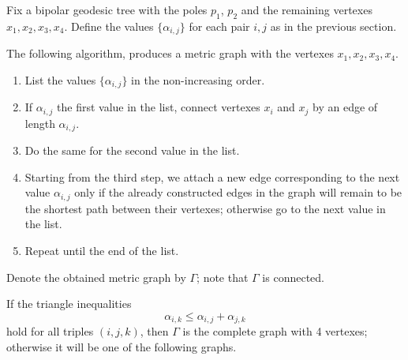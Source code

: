 Fix a bipolar geodesic tree with the poles $p_1$, $p_2$ and the remaining vertexes $x_1,x_2, x_3,x_4$.
Define the values $\{\alpha_{i,j}\}$ for each pair $i,j$ as in the previous section.

The following algorithm, produces a metric graph with the vertexes $x_1,x_2, x_3,x_4$.
\begin{enumerate}[1.]
\item List the values $\{\alpha_{i,j}\}$ in the non-increasing order.
\item If $\alpha_{i,j}$ the first value in the list, connect vertexes $x_i$ and $x_j$ by an edge of length $\alpha_{i,j}$.
\item Do the same for the second value  in the list.
\item Starting from the third step, we attach a new edge corresponding to the next value $\alpha_{i,j}$ only if the already constructed edges in the graph will remain to be the shortest path between their vertexes; otherwise go to the next value in the list. 
\item Repeat until the end of the list.
\end{enumerate}
Denote the obtained metric graph by $\Gamma$;
note that $\Gamma$ is connected. 

If the triangle inequalities 
\[\alpha_{i,k}\le \alpha_{i,j}+\alpha_{j,k}\]
hold for all triples $(i,j,k)$, then $\Gamma$ is the complete graph with 4 vertexes;
otherwise it will be one of the following graphs.

